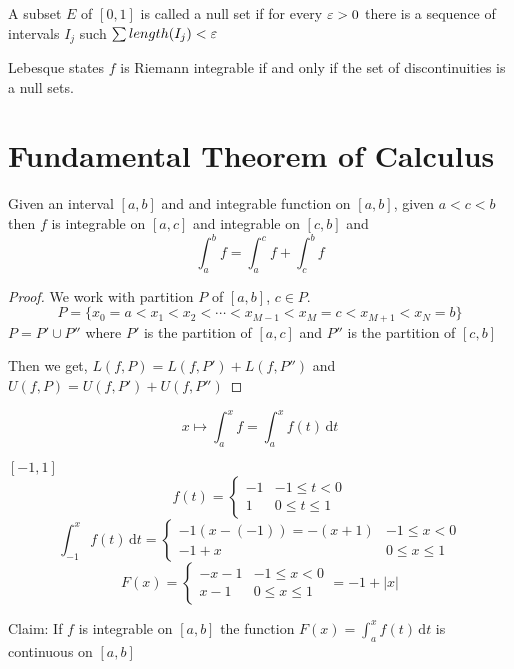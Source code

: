 \begin{theorem*}[Lebesgue]
  A subset $E$ of $[0, 1]$ is called a null set if for every $\varepsilon > 0$ 
  there is a sequence  of intervals $I_j$ such $\sum length(I_j) < \varepsilon$

  Lebesque states $f$ is Riemann integrable if and only if the set of discontinuities is a null sets.
\end{theorem*}

\section{Fundamental Theorem of Calculus}

\begin{theorem*}
  Given an interval $[a, b]$ and and integrable function on $[a, b]$, given $a < c < b$
  then $f$ is integrable on $[a, c]$ and integrable on $[c, b]$ and
  \[\int_a^b f = \int_a^c f + \int_c^b f \]
\end{theorem*}

\begin{proof}
  We work with partition $P$ of $[a, b]$, $c\in P$. 
  \[P = \{x_0 = a < x_1 < x_2 < \cdots < x_{M-1} < x_M = c < x_{M+1} < x_N = b\}\]
  $P = P' \cup P''$ where $P'$ is the partition of $[a, c]$ and $P''$ is the partition of $[c, b]$

  Then we get, 
  $L(f, P) = L(f, P') + L(f, P'')$ and 
  $U(f, P) = U(f, P') + U(f, P'')$
\end{proof}

\[ x \mapsto \int_a^x f = \int_a^x f(t) \,\mathrm{d}t \]

\begin{example*}
  $[-1, 1]$
  \[ f(t) = \begin{cases}
    -1 & -1 \le t < 0 \\
    1 &  0 \le t \le 1
  \end{cases}
    \]
  \[ \int_{-1}^x f(t)\,\mathrm{d}t = \begin{cases}
    -1(x-(-1)) = -(x+1) & -1 \le x < 0 \\
    -1+x & 0 \le x \le 1
  \end{cases}
  \]
  \[ F(x) = \begin{cases}
    -x-1 & -1 \le x < 0 \\
    x-1 & 0 \le x \le 1
  \end{cases} = -1+|x|
  \]
\end{example*}

Claim: If $f$ is integrable on $[a, b]$ the function $\displaystyle F(x) = \int_a^x f(t) \,\mathrm{d}t$ is continuous on $[a, b]$

